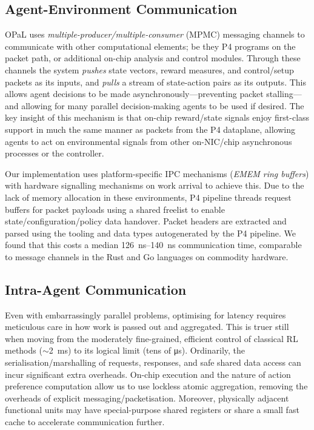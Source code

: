 \documentclass[sigconf,natbib=false]{acmart}
\newcommand{\approachshort}{OPaL}
\begin{document}
\subsection{Agent-Environment Communication}\label{sec:agent-environment-communication}
\approachshort{} uses \emph{multiple-producer/multiple-consumer} (MPMC) messaging channels to communicate with other computational elements; be they P4 programs on the packet path, or additional on-chip analysis and control modules.
Through these channels the system \emph{pushes} state vectors, reward measures, and control/setup packets as its inputs, and \emph{pulls} a stream of state-action pairs as its outputs.
This allows agent decisions to be made asynchronously---preventing packet stalling---and allowing for many parallel decision-making agents to be used if desired.
The key insight of this mechanism is that on-chip reward/state signals enjoy first-class support in much the same manner as packets from the P4 dataplane, allowing agents to act on environmental signals from other on-NIC/chip asynchronous processes or the controller.

Our implementation uses platform-specific IPC mechanisms (\emph{EMEM ring buffers}) with hardware signalling mechanisms on work arrival to achieve this.
Due to the lack of memory allocation in these environments, P4 pipeline threads request buffers for packet payloads using a shared freelist to enable state/configuration/policy data handover.
Packet headers are extracted and parsed using the tooling and data types autogenerated by the P4 pipeline.
We found that this costs a median \SIrange{126}{140}{\nano\second} communication time, comparable to message channels in the Rust and Go languages on commodity hardware.

\subsection{Intra-Agent Communication}
Even with embarrassingly parallel problems, optimising for latency requires meticulous care in how work is passed out and aggregated.
This is truer still when moving from the moderately fine-grained, efficient control of classical RL methods ($\sim$\SI{2}{\milli\second}) to its logical limit (tens of \si{\micro\second}).
Ordinarily, the serialisation/marshalling of requests, responses, and safe shared data access can incur significant extra overheads.
On-chip execution and the nature of action preference computation allow us to use lockless atomic aggregation, removing the overheads of explicit messaging/packetisation.
Moreover, physically adjacent functional units may have special-purpose shared registers or share a small fast cache to accelerate communication further.
\end{document}
